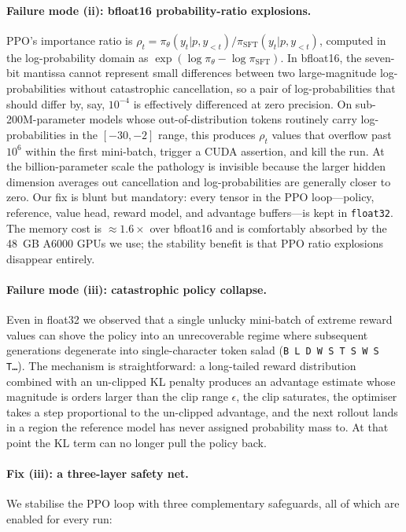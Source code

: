 \documentclass[10pt,twocolumn,letterpaper]{article}
\begin{document}
\paragraph{Failure mode (ii): bfloat16 probability-ratio explosions.}
PPO's importance ratio is $\rho_t = \pi_\theta(y_t|p,y_{<t})/\pi_{\text{SFT}}(y_t|p,y_{<t})$, computed in the log-probability domain as $\exp(\log\pi_\theta - \log\pi_{\text{SFT}})$. In bfloat16, the seven-bit mantissa cannot represent small differences between two large-magnitude log-probabilities without catastrophic cancellation, so a pair of log-probabilities that should differ by, say, $10^{-4}$ is effectively differenced at zero precision. On sub-200M-parameter models whose out-of-distribution tokens routinely carry log-probabilities in the $[-30, -2]$ range, this produces $\rho_t$ values that overflow past $10^6$ within the first mini-batch, trigger a CUDA assertion, and kill the run. At the billion-parameter scale the pathology is invisible because the larger hidden dimension averages out cancellation and log-probabilities are generally closer to zero. Our fix is blunt but mandatory: every tensor in the PPO loop---policy, reference, value head, reward model, and advantage buffers---is kept in \texttt{float32}. The memory cost is $\approx 1.6\times$ over bfloat16 and is comfortably absorbed by the 48~GB A6000 GPUs we use; the stability benefit is that PPO ratio explosions disappear entirely.

\paragraph{Failure mode (iii): catastrophic policy collapse.}
Even in float32 we observed that a single unlucky mini-batch of extreme reward values can shove the policy into an unrecoverable regime where subsequent generations degenerate into single-character token salad (\texttt{B L D W S T S W S T\ldots}). The mechanism is straightforward: a long-tailed reward distribution combined with an un-clipped KL penalty produces an advantage estimate whose magnitude is orders larger than the clip range $\epsilon$, the clip saturates, the optimiser takes a step proportional to the un-clipped advantage, and the next rollout lands in a region the reference model has never assigned probability mass to. At that point the KL term can no longer pull the policy back.

\paragraph{Fix (iii): a three-layer safety net.}
We stabilise the PPO loop with three complementary safeguards, all of which are enabled for every run:
\end{document}
